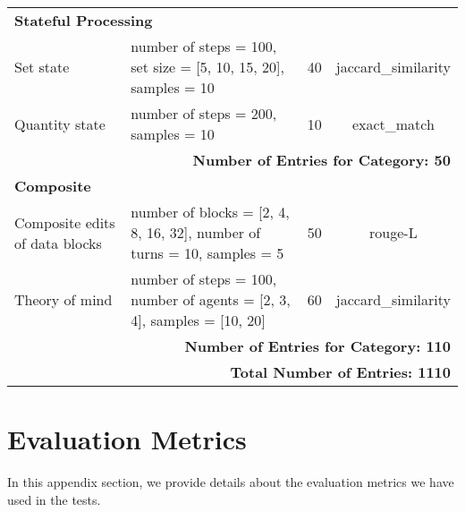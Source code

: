 \begin{longtable}{lp{6.5cm}cc}
\multicolumn{4}{l}{\textbf{Stateful Processing}} \\ 
Set state & number of steps = 100, set size = [5, 10, 15, 20], samples = 10 & 40 & jaccard\_similarity \\ 
Quantity state & number of steps = 200, samples = 10 & 10 & exact\_match \\ 
\midrule
\multicolumn{4}{r}{\textbf{Number of Entries for Category: 50}} \\ 
\midrule

\multicolumn{4}{l}{\textbf{Composite}} \\ 
Composite edits of data blocks & number of blocks = [2, 4, 8, 16, 32], number of turns = 10, samples = 5 & 50 & rouge-L \\
Theory of mind & number of steps = 100, number of agents = [2, 3, 4], samples = [10, 20] & 60 & jaccard\_similarity \\ 
\midrule
\multicolumn{4}{r}{\textbf{Number of Entries for Category: 110}} \\ 
\midrule

\multicolumn{4}{r}{\textbf{Total Number of Entries: 1110}} \\ 
\end{longtable}



\section{Evaluation Metrics}
\label{apd:eval}
In this appendix section, we provide details about the evaluation metrics we have used in the tests.

